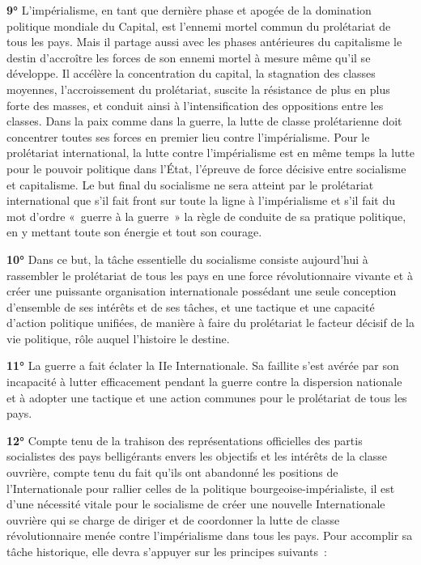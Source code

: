 \documentclass[french,twoside]{book} %
\begin{document}
\textbf{9°} L'impérialisme, en tant que dernière phase et apogée de la domination politique mondiale du Capital, est l’ennemi mortel commun du prolétariat de tous les pays. Mais il partage aussi avec les phases antérieures du capitalisme le destin d’accroître les forces de son ennemi mortel à mesure même qu’il se développe. Il accélère la concentration du capital, la stagnation des classes moyennes, l’accroissement du prolétariat, suscite la résistance de plus en plus forte des masses, et conduit ainsi à l’intensification des oppositions entre les classes. Dans la paix comme dans la guerre, la lutte de classe prolétarienne doit concentrer toutes ses forces en premier lieu contre l’impérialisme. Pour le prolétariat international, la lutte contre l’impérialisme est en même temps la lutte pour le pouvoir politique dans l’État, l’épreuve de force décisive entre socialisme et capitalisme. Le but final du socialisme ne sera atteint par le prolétariat international que s’il fait front sur toute la ligne à l’impérialisme et s’il fait du mot d’ordre « guerre à la guerre » la règle de conduite de sa pratique politique, en y mettant toute son énergie et tout son courage.\par
\textbf{10°} Dans ce but, la tâche essentielle du socialisme consiste aujourd’hui à rassembler le prolétariat de tous les pays en une force révolutionnaire vivante et à créer une puissante organisation internationale possédant une seule conception d’ensemble de ses intérêts et de ses tâches, et une tactique et une capacité d’action politique unifiées, de manière à faire du prolétariat le facteur décisif de la vie politique, rôle auquel l’histoire le destine.\par
\textbf{11°} La guerre a fait éclater la IIe Internationale. Sa faillite s’est avérée par son incapacité à lutter efficacement pendant la guerre contre la dispersion nationale et à adopter une tactique et une action communes pour le prolétariat de tous les pays.\par
\textbf{12°} Compte tenu de la trahison des représentations officielles des partis socialistes des pays belligérants envers les objectifs et les intérêts de la classe ouvrière, compte tenu du fait qu’ils ont abandonné les positions de l’Internationale pour rallier celles de la politique bourgeoise-impérialiste, il est d’une nécessité vitale pour le socialisme de créer une nouvelle Internationale ouvrière qui se charge de diriger et de coordonner la lutte de classe révolutionnaire menée contre l’impérialisme dans tous les pays. Pour accomplir sa tâche historique, elle devra s’appuyer sur les principes suivants :\par
\end{document}
